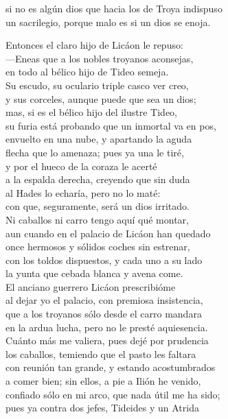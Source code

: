 si no es algún dios que hacia los de Troya indispuso\\
un sacrilegio, porque malo es si un dios se enoja.\par
Entonces el claro hijo de Licáon le repuso:\\
---Eneas que a los nobles troyanos aconsejas,\\
en todo al bélico hijo de Tideo semeja.\\
Su escudo, su oculario triple casco ver creo,\\
y sus corceles, aunque puede que sea un dios;\\
mas, si es el bélico hijo del ilustre Tideo,\\
su furia está probando que un inmortal va en pos,\\
envuelto en una nube, y apartando la aguda\\
flecha que lo amenaza; pues ya una le tiré,\\
y por el hueco de la coraza le acerté\\
a la espalda derecha, creyendo que sin duda\\
al Hades lo echaría, pero no lo maté:\\
con que, seguramente, será un dios irritado.\\
Ni caballos ni carro tengo aquí qué montar,\\
aun cuando en el palacio de Licáon han quedado\\
once hermosos y sólidos coches sin estrenar,\\
con los toldos dispuestos, y cada uno a su lado\\
la yunta que cebada blanca y avena come.\\
El anciano guerrero Licáon prescribióme\\
al dejar yo el palacio, con premiosa insistencia,\\
que a los troyanos sólo desde el carro mandara\\
en la ardua lucha, pero no le presté aquiesencia.\\
Cuánto más me valiera, pues dejé por prudencia\\
los caballos, temiendo que el pasto les faltara\\
con reunión tan grande, y estando acostumbrados\\
a comer bien; sin ellos, a pie a Ilión he venido,\\
confiado sólo en mi arco, que nada útil me ha sido;\\
pues ya contra dos jefes, Tideides y un Atrida\\
